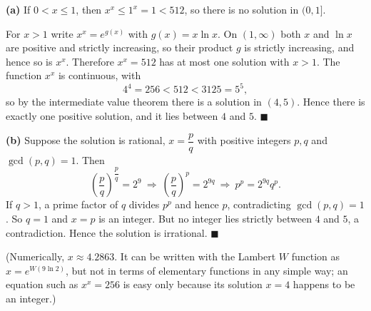 \textbf{(a)} If $0<x\le1$, then $x^x\le1^x=1<512$, so there is no solution in $(0,1]$.

For $x>1$ write $x^x=e^{g(x)}$ with $g(x)=x\ln x$. On $(1,\infty)$ both $x$ and $\ln x$ are positive and strictly increasing, so their product $g$ is strictly increasing, and hence so is $x^x$. Therefore $x^x=512$ has at most one solution with $x>1$. The function $x^x$ is continuous, with
\[4^4=256<512<3125=5^5,\]
so by the intermediate value theorem there is a solution in $(4,5)$. Hence there is exactly one positive solution, and it lies between $4$ and $5$. $\blacksquare$

\textbf{(b)} Suppose the solution is rational, $x=\dfrac pq$ with positive integers $p,q$ and $\gcd(p,q)=1$. Then
\[\left(\dfrac pq\right)^{\dfrac pq}=2^9\ \Longrightarrow\ \left(\dfrac pq\right)^{p}=2^{9q}\ \Longrightarrow\ p^p=2^{9q}q^p.\]
If $q>1$, a prime factor of $q$ divides $p^p$ and hence $p$, contradicting $\gcd(p,q)=1$. So $q=1$ and $x=p$ is an integer. But no integer lies strictly between $4$ and $5$, a contradiction. Hence the solution is irrational. $\blacksquare$

(Numerically, $x\approx4.2863$. It can be written with the Lambert $W$ function as $x=e^{W(9\ln2)}$, but not in terms of elementary functions in any simple way; an equation such as $x^x=256$ is easy only because its solution $x=4$ happens to be an integer.)

